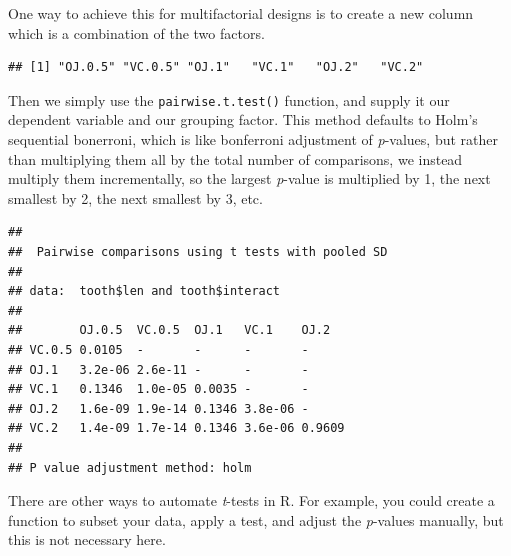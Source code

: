 \documentclass[
]{book}
\newenvironment{Shaded}{\begin{snugshade}}{\end{snugshade}}
\newcommand{\CommentTok}[1]{\textcolor[rgb]{0.56,0.35,0.01}{\textit{#1}}}
\newcommand{\FunctionTok}[1]{\textcolor[rgb]{0.00,0.00,0.00}{#1}}
\newcommand{\NormalTok}[1]{#1}
\newcommand{\OtherTok}[1]{\textcolor[rgb]{0.56,0.35,0.01}{#1}}
\newcommand{\SpecialCharTok}[1]{\textcolor[rgb]{0.00,0.00,0.00}{#1}}
\begin{document}
One way to achieve this for multifactorial designs is to create a new column which is a combination of the two factors.

\begin{Shaded}
\end{Shaded}

\begin{verbatim}
## [1] "OJ.0.5" "VC.0.5" "OJ.1"   "VC.1"   "OJ.2"   "VC.2"
\end{verbatim}

Then we simply use the \texttt{pairwise.t.test()} function, and supply it our dependent variable and our grouping factor. This method defaults to Holm's sequential bonerroni, which is like bonferroni adjustment of \emph{p}-values, but rather than multiplying them all by the total number of comparisons, we instead multiply them incrementally, so the largest \emph{p}-value is multiplied by 1, the next smallest by 2, the next smallest by 3, etc.

\begin{Shaded}
\end{Shaded}

\begin{verbatim}
## 
##  Pairwise comparisons using t tests with pooled SD 
## 
## data:  tooth$len and tooth$interact 
## 
##        OJ.0.5  VC.0.5  OJ.1   VC.1    OJ.2  
## VC.0.5 0.0105  -       -      -       -     
## OJ.1   3.2e-06 2.6e-11 -      -       -     
## VC.1   0.1346  1.0e-05 0.0035 -       -     
## OJ.2   1.6e-09 1.9e-14 0.1346 3.8e-06 -     
## VC.2   1.4e-09 1.7e-14 0.1346 3.6e-06 0.9609
## 
## P value adjustment method: holm
\end{verbatim}

There are other ways to automate \emph{t}-tests in R. For example, you could create a function to subset your data, apply a test, and adjust the \emph{p}-values manually, but this is not necessary here.
\end{document}
